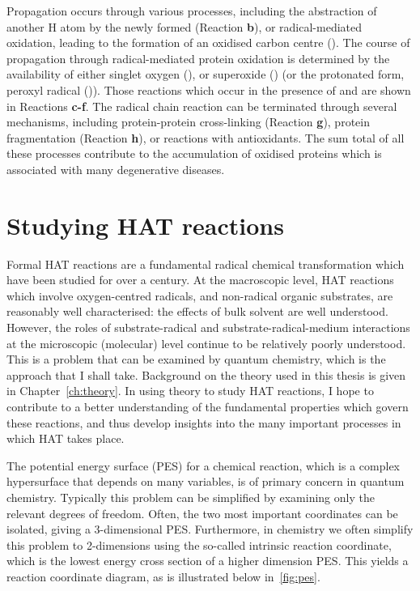 {Propagation occurs through various processes, including the abstraction of another H atom by the newly formed  (Reaction \textbf{b}), or radical-mediated oxidation,\cite{Stadtman2003} leading to the formation of an oxidised carbon centre (). The course of propagation through radical-mediated protein oxidation is determined by the availability of either singlet oxygen (), or superoxide () (or the protonated form, peroxyl radical ()). Those reactions which occur in the presence of  and  are shown in Reactions \textbf{c-f}. The radical chain reaction can be terminated through several mechanisms, including protein-protein cross-linking (Reaction \textbf{g}), protein fragmentation (Reaction \textbf{h}), or reactions with antioxidants. The sum total of all these processes contribute to the accumulation of oxidised proteins which is associated with many degenerative diseases.\cite{Halliwell2006}

\section{Studying HAT reactions}

Formal HAT reactions are a fundamental radical chemical transformation which have been studied for over a century.\cite{Kochi1973, Parsons2000} At the macroscopic level, HAT reactions which involve oxygen-centred radicals, and non-radical organic substrates, are reasonably well characterised: the effects of bulk solvent are well understood.\cite{Litwinienko2007} However, the roles of substrate-radical and substrate-radical-medium interactions at the microscopic (molecular) level continue to be relatively poorly understood. This is a problem that can be examined by quantum chemistry, which is the approach that I shall take. Background on the theory used in this thesis is given in Chapter~\ref{ch:theory}. In using theory to study HAT reactions, I hope to contribute to a better understanding of the fundamental properties which govern these reactions, and thus develop insights into the many important processes in which HAT takes place.

The potential energy surface (PES) for a chemical reaction, which is a complex hypersurface that depends on many variables, is of primary concern in quantum chemistry. Typically this problem can be simplified by examining only the relevant degrees of freedom. Often, the two most important coordinates can be isolated, giving a 3-dimensional PES. Furthermore, in chemistry we often simplify this problem to 2-dimensions using the so-called intrinsic reaction coordinate, which is the lowest energy cross section of a higher dimension PES. This yields a reaction coordinate diagram, as is illustrated below in~\ref{fig:pes}.

}

